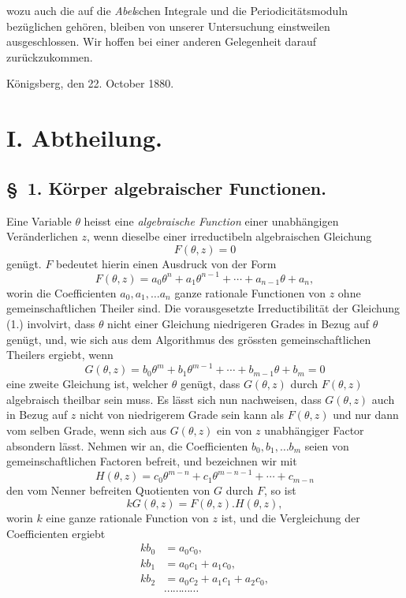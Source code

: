 \documentclass{article}
\begin{document}
wozu auch die auf die \emph{Abel}schen Integrale und die Periodicitätsmoduln bezüglichen gehören, bleiben von unserer Untersuchung einstweilen ausgeschlossen. Wir hoffen bei einer anderen Gelegenheit darauf zurückzukommen.

Königsberg, den 22. October 1880.

\section*{I. Abtheilung.}

\subsection*{§~1. Körper algebraischer Functionen.}

Eine Variable $\theta$ heisst eine \emph{algebraische Function} einer unabhängigen Veränderlichen $z$, wenn dieselbe einer irreductibeln algebraischen Gleichung
\[ F(\theta, z) = 0 \tag{1.} \]
genügt. $F$ bedeutet hierin einen Ausdruck von der Form
\[ F(\theta, z) = a_{0}\theta^{n} + a_{1}\theta^{n-1} + \cdots + a_{n-1}\theta + a_{n}, \]
worin die Coefficienten $a_{0}, a_{1}, \ldots a_{n}$ ganze rationale Functionen von $z$ ohne gemeinschaftlichen Theiler sind. Die vorausgesetzte Irreductibilität der Gleichung (1.) involvirt, dass $\theta$ nicht einer Gleichung niedrigeren Grades in Bezug auf $\theta$ genügt, und, wie sich aus dem Algorithmus des grössten gemeinschaftlichen Theilers ergiebt, wenn
\[ G(\theta, z) = b_{0}\theta^{m} + b_{1}\theta^{m-1} + \cdots + b_{m-1}\theta + b_{m} = 0 \]
eine zweite Gleichung ist, welcher $\theta$ genügt, dass $G(\theta, z)$ durch $F(\theta, z)$ algebraisch theilbar sein muss. Es lässt sich nun nachweisen, dass $G(\theta, z)$ auch in Bezug auf $z$ nicht von niedrigerem Grade sein kann als $F(\theta, z)$ und nur dann vom selben Grade, wenn sich aus $G(\theta, z)$ ein von $z$ unabhängiger Factor absondern lässt. Nehmen wir an, die Coefficienten $b_{0}, b_{1}, \ldots b_{m}$ seien von gemeinschaftlichen Factoren befreit, und bezeichnen wir mit
\[ H(\theta, z) = c_{0}\theta^{m-n} + c_{1}\theta^{m-n-1} + \cdots + c_{m-n} \]
den vom Nenner befreiten Quotienten von $G$ durch $F$, so ist
\[ kG(\theta, z) = F(\theta, z).H(\theta, z), \]
worin $k$ eine ganze rationale Function von $z$ ist, und die Vergleichung der Coefficienten ergiebt
\[ \begin{aligned} kb_{0} &= a_{0}c_{0}, \\ kb_{1} &= a_{0}c_{1} + a_{1}c_{0}, \\ kb_{2} &= a_{0}c_{2} + a_{1}c_{1} + a_{2}c_{0}, \\ &\cdots\cdots\cdots\cdots \end{aligned} \]
\end{document}
